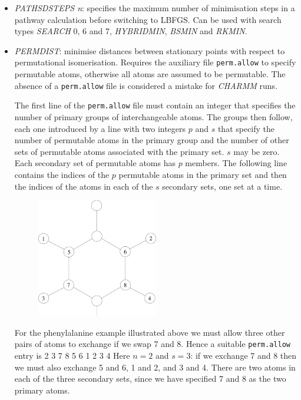 \documentclass[12pt,a4paper,dvips]{article}
\begin{document}
\begin{itemize}
\item {\it PATHSDSTEPS n\/}: specifies the maximum number of minimisation steps
in a pathway calculation before switching to LBFGS. Can be used with search types
{\it SEARCH\/} 0, 6 and 7, {\it HYBRIDMIN\/}, {\it BSMIN\/} and {\it RKMIN\/}.

\item {\it PERMDIST\/}: minimise distances between stationary points with respect to
permutational isomerisation.
Requires the auxiliary file {\tt perm.allow} to specify permutable atoms, otherwise
all atoms are assumed to be permutable. The absence of a {\tt perm.allow}
file is considered a mistake for {\it CHARMM\/} runs.

The first line of the {\tt perm.allow} file must contain an integer
that specifies the number of primary groups of interchangeable atoms.
The groups then follow, each one introduced by a line with two integers $p$ and $s$
that specify the number of permutable atoms in the primary group and the number of other sets
of permutable atoms associated with the primary set.
$s$ may be zero.
Each secondary set of permutable atoms has $p$ members.
The following line contains the indices of the $p$ permutable atoms 
in the primary set and then
the indices of the atoms in each of the $s$ secondary sets, one set at 
a time.

\begin{figure}[hH]
\centerline{\includegraphics[width=0.5\textwidth]{PHE.eps}}
\end{figure}

For the phenylalanine example illustrated above we must allow three other pairs of
atoms to exchange if we swap 7 and 8. Hence a suitable {\tt perm.allow} entry is
{
2 3
7 8 5 6 1 2 3 4
}
Here $n=2$ and $s=3$: if we exchange 7 and 8 then we must also exchange 5 and 6,
1 and 2, and 3 and 4. There are two atoms in each of the three secondary sets, 
since we have specified 7 and 8 as the two primary atoms.


\end{itemize}
\end{document}
